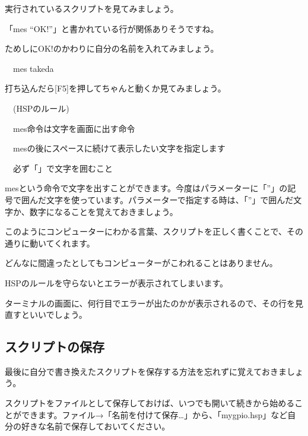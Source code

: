 \documentclass[a4paper,12pt]{jarticle}
\begin{document}
\bigskip
\bigskip
\bigskip

実行されているスクリプトを見てみましょう。

「mes “OK!”」と書かれている行が関係ありそうですね。

ためしに{\textquotedbl}OK!{\textquotedbl}のかわりに自分の名前を入れてみましょう。


\bigskip

\ \ mes {\textquotedbl}takeda{\textquotedbl}


\bigskip

打ち込んだら[F5]を押してちゃんと動くか見てみましょう。


\bigskip

\ \ (HSPのルール)


\bigskip

\ \ mes命令は文字を画面に出す命令

\ \ mesの後にスペースに続けて表示したい文字を指定します

\ \ 必ず「{\textquotedbl}」で文字を囲むこと


\bigskip

mesという命令で文字を出すことができます。今度はパラメーターに「”」の記号で囲んだ文字を使っています。パラメーターで指定する時は、「”」で囲んだ文字か、数字になることを覚えておきましょう。


\bigskip

このようにコンピューターにわかる言葉、スクリプトを正しく書くことで、その通りに動いてくれます。

どんなに間違ったとしてもコンピューターがこわれることはありません。

HSPのルールを守らないとエラーが表示されてしまいます。

ターミナルの画面に、何行目でエラーが出たのかが表示されるので、その行を見直すといいでしょう。


\bigskip

\subsection{スクリプトの保存}
\bigskip
\bigskip

最後に自分で書き換えたスクリプトを保存する方法を忘れずに覚えておきましょう。

スクリプトをファイルとして保存しておけば、いつでも開いて続きから始めることができます。ファイル→「名前を付けて保存…」から、「mygpio.hsp」など自分の好きな名前で保存しておいてください。

\bigskip
\bigskip
\end{document}
